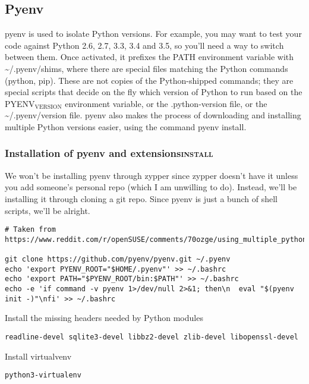 \documentclass[11pt]{article}
\begin{document}
\subsection{Pyenv}
\label{sec:org4904965}
pyenv is used to isolate Python versions. For example, you may want to test your code against Python 2.6, 2.7, 3.3, 3.4 and 3.5, so you'll need a way to switch between them. Once activated, it prefixes the PATH environment variable with \textasciitilde{}/.pyenv/shims, where there are special files matching the Python commands (python, pip). These are not copies of the Python-shipped commands; they are special scripts that decide on the fly which version of Python to run based on the PYENV\(_{\text{VERSION}}\) environment variable, or the .python-version file, or the \textasciitilde{}/.pyenv/version file. pyenv also makes the process of downloading and installing multiple Python versions easier, using the command pyenv install.

\subsubsection{Installation of pyenv and extensions\hfill{}\textsc{install}}
\label{sec:org46c33a5}

We won't be installing pyenv through zypper since zypper doesn't have it unless you add someone's personal repo (which I am unwilling to do).
Instead, we'll be installing it through cloning a git repo. Since pyenv is just a bunch of shell scripts, we'll be alright.

\begin{verbatim}
# Taken from https://www.reddit.com/r/openSUSE/comments/70ozge/using_multiple_python_versions_on_leap/dos6798

git clone https://github.com/pyenv/pyenv.git ~/.pyenv
echo 'export PYENV_ROOT="$HOME/.pyenv"' >> ~/.bashrc
echo 'export PATH="$PYENV_ROOT/bin:$PATH"' >> ~/.bashrc
echo -e 'if command -v pyenv 1>/dev/null 2>&1; then\n  eval "$(pyenv init -)"\nfi' >> ~/.bashrc
\end{verbatim}

Install the missing headers needed by Python modules
\begin{verbatim}
readline-devel sqlite3-devel libbz2-devel zlib-devel libopenssl-devel
\end{verbatim}

Install virtualvenv
\begin{verbatim}
python3-virtualenv
\end{verbatim}
\end{document}

